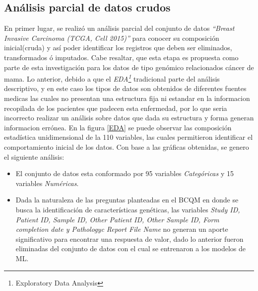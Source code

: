 \subsection{Análisis parcial de datos crudos}
En primer lugar, se realizó un análisis parcial del conjunto de datos \textit{“Breast Invasive Carcinoma (TCGA, Cell 2015)”} para conocer su composición inicial(cruda) y así poder identificar los registros que deben ser eliminados, transformados ó imputados. Cabe resaltar, que esta etapa es propuesta como parte de esta investigación para los datos de tipo genómico relacionados cáncer de mama. Lo anterior, debido a que el \textit{EDA\footnote{Exploratory Data Analysis}} tradicional parte del análisis descriptivo, y en este caso los tipos de datos son obtenidos de diferentes fuentes medicas las cuales no presentan una estructura fija ni estandar  en la informacion recopilada de los pacientes que padecen esta enfermedad, por lo que seria incorrecto realizar un análisis sobre datos que dada su estructura y forma generan informacion errónea. En la figura \ref{EDA} se puede observar las composición estadística unidimensional de la 110 variables, las cuales permitieron identificar el comportamiento inicial de los datos. Con base a las gráficas obtenidas, se genero el siguiente análisis: 

\begin{itemize}[label=\HandPencilLeft]
	\item El conjunto de datos esta conformado por 95 variables \textit{Categóricas} y 15 variables \textit{Numéricas}.
	
	\item Dada la naturaleza de las preguntas planteadas en el BCQM en donde se busca la identificación de características genéticas, las variables \textit{Study ID, Patient ID, Sample ID, Other Patient ID, Other Sample ID, Form completion date y Pathologyc Report File Name} no generan un aporte significativo para encontrar una respuesta de valor, dado lo anterior fueron eliminadas del conjunto de datos con el cual se entrenaron a los modelos de ML.
\end{itemize}

